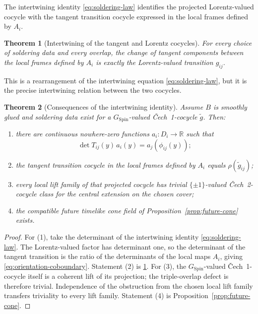 \documentclass[11pt,a4paper]{article}
\newtheorem{theorem}{Theorem}[section]
\theoremstyle{definition}
\theoremstyle{remark}
\newcommand{\R}{\mathbb{R}}
\newcommand{\SpinG}{G_{\mathrm{Spin}}}
\newcommand{\Cech}{\ifmmode\text{\v{C}ech}\else\v{C}ech\fi}
\begin{document}
The intertwining identity \eqref{eq:soldering-law} identifies the projected Lorentz-valued cocycle with the tangent transition cocycle expressed in the local frames defined by \(A_i\).

\begin{theorem}[Intertwining of the tangent and Lorentz cocycles]
\label{thm:cocycle-identification}
For every choice of soldering data and every overlap, the change of tangent components between the local frames defined by \(A_i\) is exactly the Lorentz-valued transition \(g_{ij}\).
\end{theorem}

This is a rearrangement of the intertwining equation \eqref{eq:soldering-law}, but it is the precise intertwining relation between the two cocycles.

\begin{theorem}[Consequences of the intertwining identity]
\label{thm:soldering-consequences}
Assume \(B\) is smoothly glued and soldering data exist for a \(\SpinG\)-valued \Cech\ 1-cocycle \(\widetilde g\).  Then:
\begin{enumerate}
\item there are continuous nowhere-zero functions
      \(a_i:D_i\to\R\) such that
\[
  \det T_{ij}(y)\,a_i(y)
  =
  a_j(\phi_{ij}(y));
\tag{9.4}\label{eq:orientation-coboundary}
\]
\item the tangent transition cocycle in the local frames defined by \(A_i\) equals
      \(\rho(\widetilde g_{ij})\);
\item every local lift family of that projected cocycle has trivial \(\{\pm1\}\)-valued \Cech\ 2-cocycle class for the central extension on the chosen cover;
\item the compatible future timelike cone field of
      Proposition~\ref{prop:future-cone} exists.
\end{enumerate}
\end{theorem}

\begin{proof}
For (1), take the determinant of the intertwining identity \eqref{eq:soldering-law}.
The Lorentz-valued factor has determinant one, so the determinant of the
tangent transition is the ratio of the determinants of the local maps \(A_i\), giving
\eqref{eq:orientation-coboundary}.  Statement (2) is
\cref{thm:cocycle-identification}.  For (3), the \(\SpinG\)-valued \Cech\ 1-cocycle itself
is a coherent lift of its projection; the triple-overlap defect is
therefore trivial.  Independence of the obstruction from the chosen local
lift family transfers triviality to every lift family.  Statement (4) is
Proposition~\ref{prop:future-cone}.
\end{proof}
\end{document}

